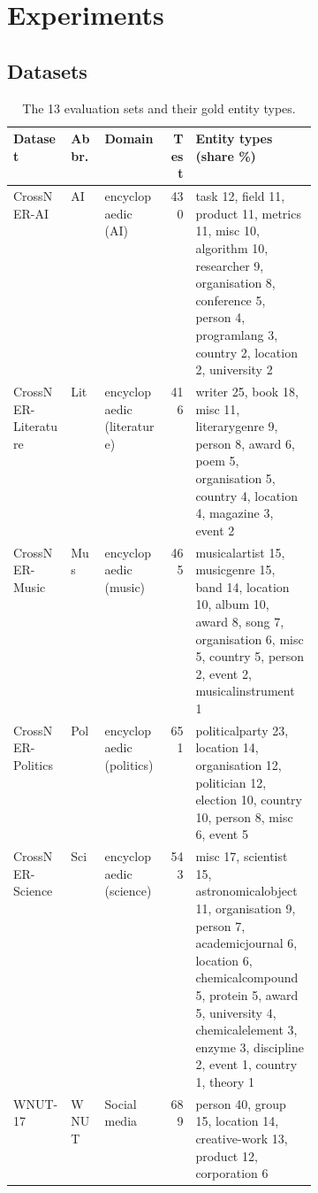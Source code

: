 \section{Experiments}
\label{sec:experiments}


\subsection{Datasets}
\label{sec:exp:datasets}

\begin{table}[H]
\centering
\caption{The 13 evaluation sets and their gold entity types.}
\label{tab:datasets}
\scriptsize
\setlength{\tabcolsep}{4pt}
\begin{threeparttable}
\begin{tabular}{@{}lllr>{\raggedright\arraybackslash}p{0.40\linewidth}@{}}
\toprule
Dataset & Abbr. & Domain & Test & Entity types (share \%) \\
\midrule
CrossNER-AI & AI & encyclopaedic (AI) & 430 & task 12, field 11, product 11, metrics 11, misc 10, algorithm 10, researcher 9, organisation 8, conference 5, person 4, programlang 3, country 2, location 2, university 2 \\
\addlinespace
CrossNER-Literature & Lit & encyclopaedic (literature) & 416 & writer 25, book 18, misc 11, literarygenre 9, person 8, award 6, poem 5, organisation 5, country 4, location 4, magazine 3, event 2 \\
\addlinespace
CrossNER-Music & Mus & encyclopaedic (music) & 465 & musicalartist 15, musicgenre 15, band 14, location 10, album 10, award 8, song 7, organisation 6, misc 5, country 5, person 2, event 2, musicalinstrument 1 \\
\addlinespace
CrossNER-Politics & Pol & encyclopaedic (politics) & 651 & politicalparty 23, location 14, organisation 12, politician 12, election 10, country 10, person 8, misc 6, event 5 \\
\addlinespace
CrossNER-Science & Sci & encyclopaedic (science) & 543 & misc 17, scientist 15, astronomicalobject 11, organisation 9, person 7, academicjournal 6, location 6, chemicalcompound 5, protein 5, award 5, university 4, chemicalelement 3, enzyme 3, discipline 2, event 1, country 1, theory 1 \\
\addlinespace
WNUT-17 & WNUT & Social media & 689 & person 40, group 15, location 14, creative-work 13, product 12, corporation 6 \\

\end{tabular}
\end{threeparttable}
\end{table}
